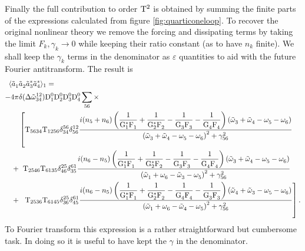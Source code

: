 Finally the full contribution to order $\mathrm{T}^2$ is obtained by summing the finite parts of the expressions calculated from figure \ref{fig:quarticoneloop}.
To recover the original nonlinear theory we remove the forcing and dissipating terms by taking the limit $F_k, \gamma_k \rightarrow 0$ while keeping their ratio constant
(as to have $n_k$ finite). We shall keep the $\gamma_k$ terms in the denominator as $\varepsilon$ quantities to aid with the future Fourier antitransform. The result is
\begin{equation}
    \begin{aligned}
    \langle\tilde{a}_1^{} &\tilde{a}_2^{}\tilde{a}_3^{*}\tilde{a}_4^{*} \rangle_1 = 
    \\
    -4\pi &\delta(\Delta{\tilde{\omega}}^{12}_{34})\mathrm{D}^0_1\mathrm{D}^0_2\mathrm{D}^0_3\mathrm{D}^0_4 \sum_{56} \times
    \\
      &\left[\mathrm{T}_{5634}\mathrm{T}_{1256}\delta^{56}_{34}\delta^{12}_{56}
    \frac{i(n_5 + n_6)\left(\dfrac{1}{\mathrm{G}_1^*\mathrm{F}_1^{}}+\dfrac{1}{\mathrm{G}_2^*\mathrm{F}_2^{}}-\dfrac{1}{\mathrm{G}_3^{}\mathrm{F}_3^{}}
    -\dfrac{1}{\mathrm{G}_4^{}\mathrm{F}_4^{}}\right)\left( \tilde{\omega}^{}_3 + \tilde{\omega}^{}_4 - \omega^{}_5 - \omega^{}_6\right)}{\left( \tilde{\omega}^{}_3 + \tilde{\omega}^{}_4 - \omega^{}_5 - \omega^{}_6\right)^2 + \gamma^2_{56}}
      \right.
    \\
    +&\hspace{2mm}\mathrm{T}_{2546}\mathrm{T}_{6135}\delta^{25}_{46}\delta^{61}_{35}
    \frac{i(n_6 - n_5)\left(\dfrac{1}{\mathrm{G}_1^*\mathrm{F}_1^{}}+\dfrac{1}{\mathrm{G}_2^*\mathrm{F}_2^{}}-\dfrac{1}{\mathrm{G}_3^{}\mathrm{F}_3^{}}
    -\dfrac{1}{\mathrm{G}_4^{}\mathrm{F}_4^{}}\right)\left( \tilde{\omega}^{}_3 + \tilde{\omega}^{}_4 - \omega^{}_5 - \omega^{}_6\right)}{\left( \tilde{\omega}^{}_1 + \omega^{}_6 - \tilde{\omega}^{}_3 - \omega^{}_5\right)^2 + \gamma^2_{56}}\\
    +&\hspace{2mm}\left. \mathrm{T}_{2536}\mathrm{T}_{6145}\delta^{25}_{36}\delta^{61}_{45}
    \frac{i(n_6 - n_5)\left(\dfrac{1}{\mathrm{G}_1^*\mathrm{F}_1^{}}+\dfrac{1}{\mathrm{G}_2^*\mathrm{F}_2^{}}-\dfrac{1}{\mathrm{G}_4^{}\mathrm{F}_4^{}}
    -\dfrac{1}{\mathrm{G}_3^{}\mathrm{F}_3^{}}\right)\left( \tilde{\omega}^{}_4 + \tilde{\omega}^{}_3 - \omega^{}_5 - \omega^{}_6\right)}{\left( \tilde{\omega}^{}_1 + \omega^{}_6 - \tilde{\omega}^{}_4 - \omega^{}_5\right)^2 + \gamma^2_{56}} \right].
    \end{aligned}
    \label{transformedfourpoint}
\end{equation}
To Fourier transform this expression is a rather straightforward but cumbersome task. In doing so it is useful to have kept the $\gamma$ in the denominator. 
